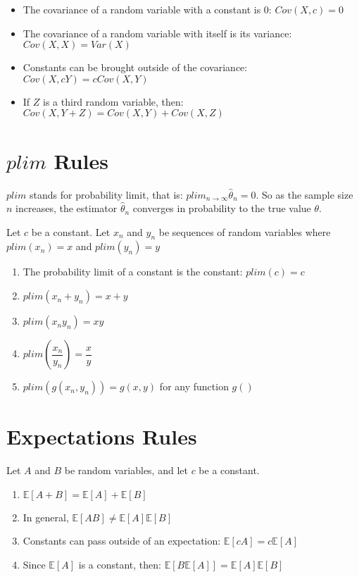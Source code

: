 \documentclass[11pt]{article}
\begin{document}
\begin{itemize}
    \item The covariance of a random variable with a constant is 0: $Cov(X,c) = 0$
    \item The covariance of a random variable with itself is its variance: $Cov(X,X) = Var(X)$
    \item Constants can be brought outside of the covariance: $Cov(X,cY) = cCov(X,Y)$
    \item If $Z$ is a third random variable, then: $Cov(X,Y + Z) = Cov(X,Y) + Cov(X,Z)$
\end{itemize}


\section*{$plim$ Rules}

$plim$ stands for probability limit, that is: $plim_{n \rightarrow \infty} \hat{\theta}_{n} = 0$. So as the sample size $n$ increases, the estimator $\hat{\theta}_{n}$ converges in probability to the true value $\theta$.

\noindent Let $c$ be a constant. 
Let $x_{n}$ and $y_{n}$ be sequences of random variables where $plim(x_{n}) = x$ and $plim(y_{n}) = y$
\begin{enumerate}
    \item The probability limit of a constant is the constant: $plim(c) = c$
    \item $plim(x_{n} + y_{n}) = x + y$
    \item $plim(x_{n}y_{n}) = xy$
    \item $plim(\dfrac{x_{n}}{y_{n}}) = \dfrac{x}{y}$
    \item $plim(g(x_{n},y_{n})) = g(x,y)$ for any function $g()$
\end{enumerate}

\section*{Expectations Rules}

Let $A$ and $B$ be random variables, and let $c$ be a constant.

\begin{enumerate}
    \item $\mathbb{E}[A + B] = \mathbb{E}[A] + \mathbb{E}[B]$
    \item In general, $\mathbb{E}[AB] \neq \mathbb{E}[A]\mathbb{E}[B]$
    \item Constants can pass outside of an expectation: $\mathbb{E}[cA] = c\mathbb{E}[A]$
    \item Since $\mathbb{E}[A]$ is a constant, then: $\mathbb{E}[B \mathbb{E}[A]] = \mathbb{E}[A] \mathbb{E}[B]$
\end{enumerate}
\end{document}
